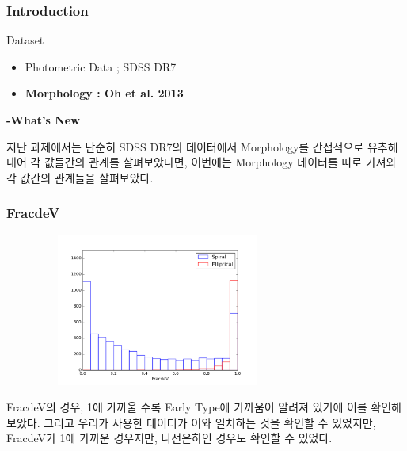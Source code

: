 \documentclass[xcolor={dvipsnames,table}]{beamer}
\newcommand\NM{\fontsize{9}{7.2}\selectfont}
\newcommand\SM{\fontsize{8}{7.2}\selectfont}
\begin{document}
\begin{frame}
  \frametitle{Introduction}
  \NM
  \begin{block}{Dataset}
  \begin{itemize}
   \item Photometric Data ; SDSS DR7
   \vspace{0.3cm}
   \item \textbf{Morphology : Oh et al. 2013}
  \end{itemize}
  \end{block}
  \vspace{0.3cm}
  \textbf{-What's New}
  \vspace{0.2cm}
  
\hspace{0.3cm}지난 과제에서는 단순히 SDSS DR7의 데이터에서 Morphology를 간접적으로 유추해내어 각 값들간의 관계를 살펴보았다면, 이번에는 Morphology 데이터를 따로
가져와 각 값간의 관계들을 살펴보았다.
 
\end{frame}

\begin{frame}
 \frametitle{FracdeV}
 \SM
 \begin{figure}
   \centering
    \includegraphics[width=8cm, height=5cm]{fracdev.png}
 \end{figure}

 \hspace{0.3cm}FracdeV의 경우, 1에 가까울 수록 Early Type에 가까움이 알려져 있기에 이를 \linebreak 확인해보았다. 그리고 우리가 사용한 데이터가 이와
일치하는 것을 확인할 수 있었지만, FracdeV가 1에 가까운 경우지만, 나선은하인 경우도 확인할 수 있었다.

 
\end{frame}
\end{document}
